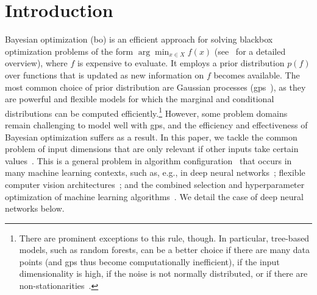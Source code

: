 \documentclass{article}
\newcommand{\bo}{{\sc bo}}
\newcommand{\gp}{{\sc gp}}
\begin{document}
\section{Introduction}
\vspace{-0.05in} 


Bayesian optimization (\bo) is an efficient approach for solving blackbox optimization problems of the form $\arg\min_{x \in X} f(x)$ (see~\cite{Brochu2010} for a detailed overview), where $f$ is expensive to evaluate. 
It employs a prior distribution $p(f)$ over functions that is updated as new information on $f$ becomes available.
%
The most common choice of prior distribution are Gaussian processes (\gp s~\cite{rasmussen38gaussian}), as they are powerful and flexible models for which the marginal and conditional distributions can be computed efficiently.\footnote{There are prominent exceptions to this rule, though. In particular, tree-based models, such as random forests, can be a better choice if there are many data points (and \gp s thus become computationally inefficient), if the input dimensionality is high, if the noise is not normally distributed, or if there are non-stationarities~\cite{TadGraPol11,HutHooLey11,bergstra2011algorithms}.}
%
However, some problem domains remain challenging to model well with \gp s, and the efficiency and effectiveness of Bayesian optimization suffers as a result. In this paper, we tackle the common problem of input dimensions that are only relevant if other inputs take certain values~\cite{Hut09:phd,bergstra2011algorithms}. This is a general problem in algorithm configuration~\cite{Hut09:phd} that occurs in many machine learning contexts, such as, e.g., in deep neural networks~\cite{HinOsiTeh06}; flexible computer vision architectures~\cite{BerYamCox13}; and the combined selection and hyperparameter optimization of machine learning algorithms~\cite{ThoEtAl13}. We detail the case of deep neural networks below.
\end{document}
